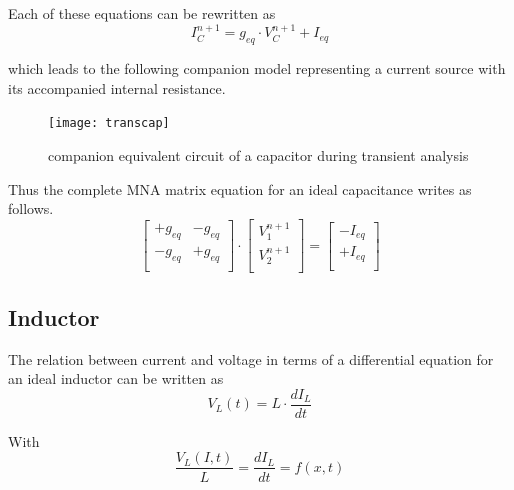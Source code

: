 \documentclass[10pt]{report}
\begin{document}
Each of these equations can be rewritten as
\begin{equation}
I_C^{n+1} = g_{eq}\cdot V_C^{n+1} + I_{eq}
\end{equation}

which leads to the following companion model representing a current
source with its accompanied internal resistance.
\begin{figure}[ht]
\begin{center}
\texttt{[image: transcap]}
\end{center}
\caption{companion equivalent circuit of a capacitor during transient analysis}
\label{fig:TransCap}
\end{figure}
\FloatBarrier

Thus the complete MNA matrix equation for an ideal capacitance writes
as follows.
\begin{equation}
\begin{bmatrix}
+g_{eq} & -g_{eq}\\
-g_{eq} & +g_{eq}\\
\end{bmatrix}
\cdot
\begin{bmatrix}
V_1^{n+1}\\
V_2^{n+1}\\
\end{bmatrix}
=
\begin{bmatrix}
-I_{eq}\\
+I_{eq}\\
\end{bmatrix}
\end{equation}

\subsection{Inductor}

The relation between current and voltage in terms of a differential
equation for an ideal inductor can be written as
\begin{equation}
V_L(t) = L\cdot \dfrac{d I_L}{d t}
\end{equation}

With
\begin{equation}
\dfrac{V_L(I, t)}{L} = \dfrac{d I_L}{d t} = f(x,t)
\end{equation}
\end{document}

